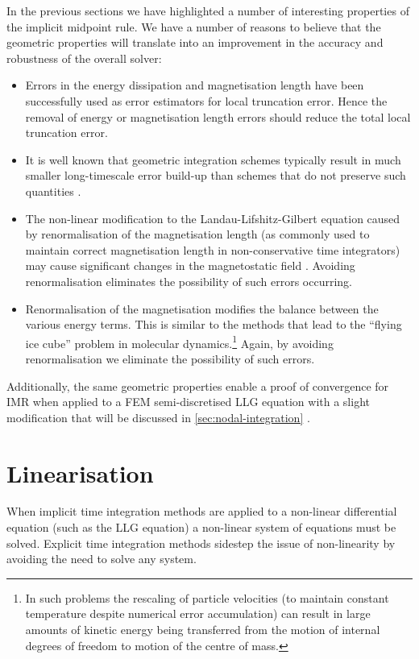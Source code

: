 In the previous sections we have highlighted a number of interesting properties of the implicit midpoint rule.
We have a number of reasons to believe that the geometric properties will translate into an improvement in the accuracy and robustness of the overall solver:
\begin{itemize}
\item Errors in the energy dissipation \cite{Albuquerque2001} and magnetisation length \cite{Chantrell2001} have been successfully used as error estimators for local truncation error.
Hence the removal of energy or magnetisation length errors should reduce the total local truncation error.
\item It is well known that geometric integration schemes typically result in much smaller long-timescale error build-up than schemes that do not preserve such quantities \cite[77]{Iserles2009}.
\item The non-linear modification to the Landau-Lifshitz-Gilbert equation caused by renormalisation of the magnetisation length (as commonly used to maintain correct magnetisation length in non-conservative time integrators) may cause significant changes in the magnetostatic field \cite{Lewis2003}.
Avoiding renormalisation eliminates the possibility of such errors occurring.
\item Renormalisation of the magnetisation modifies the balance between the various energy terms.
This is similar to the methods that lead to the ``flying ice cube'' problem \cite{Harvey1998} in molecular dynamics.\footnote{In such problems the rescaling of particle velocities (to maintain constant temperature despite numerical error accumulation) can result in large amounts of kinetic energy being transferred from the motion of internal degrees of freedom to motion of the centre of mass.}
Again, by avoiding renormalisation we eliminate the possibility of such errors.
\end{itemize}

Additionally, the same geometric properties enable a proof of convergence for IMR when applied to a FEM semi-discretised LLG equation with a slight modification that will be discussed in \cref{sec:nodal-integration} \cite{Bartels2006}.


\section{Linearisation}
\label{sec:linearisation}

When implicit time integration methods are applied to a non-linear differential equation (such as the LLG equation) a non-linear system of equations must be solved.
Explicit time integration methods sidestep the issue of non-linearity by avoiding the need to solve any system.


